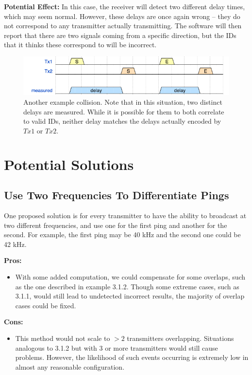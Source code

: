 \documentclass[12pt]{article}
\begin{document}
{\bf Potential Effect:}
In this case, the receiver will detect two different delay times, which may
seem normal. However, these delays are once again wrong -- they do not
correspond to any transmitter actually transmitting.
The software will then report that there are two signals coming from a
specific direction, but the IDs that it thinks these correspond to will
be incorrect.

\begin{figure}[h]
	\centering
		\includegraphics[scale=0.7]{collision2}
		
		\caption{Another example collision. Note that in this situation,
		two distinct delays are measured. While it is possible for them
		to both correlate to valid IDs, neither delay matches the delays
		actually encoded by $Tx1$ or $Tx2$.}
\end{figure}

\section{Potential Solutions}

\subsection{Use Two Frequencies To Differentiate Pings}

One proposed solution is for every transmitter to have the ability to broadcast
at two different frequencies, and use one for the first ping and another for
the second. For example, the first ping may be 40 kHz and the second one could
be 42 kHz.

{\bf Pros:}
\begin{itemize}
	\item With some added computation, we could compensate for some overlaps,
	such as the one described in example 3.1.2.
	Though some extreme cases, such as 3.1.1, would still lead to undetected
	incorrect results, the majority of overlap cases could be fixed.
\end{itemize}

{\bf Cons:}
\begin{itemize}
	\item This method would not scale to $>2$ transmitters overlapping. 
		Situations analogous to 3.1.2 but with 3 or more transmitters would
		still cause problems.
		However, the likelihood of such events occurring is extremely low in
		almost any reasonable configuration.
\end{itemize}
\end{document}
